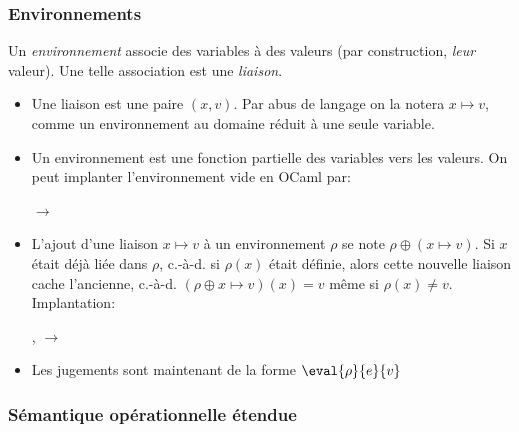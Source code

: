 %
\begin{frame}
\frametitle{Environnements}

Un \emph{environnement} associe des variables à des valeurs (par
construction, \emph{leur} valeur). Une telle association est une
\emph{liaison}.

\begin{itemize}

  \item Une liaison est une paire $(x,v)$. Par abus de
  langage on la notera $x \mapsto v$, comme un environnement au
  domaine réduit à une seule variable.

  \item Un environnement est une fonction partielle des
  variables vers les valeurs. On peut implanter l'environnement vide
  en OCaml par:

  \centerline{\small \Xlet {} \equal \Xfun {}
  $\rightarrow$  }

  \item L'ajout d'une liaison $x \mapsto v$ à un
  environnement $\rho$ se note $\rho \oplus (x \mapsto v)$. Si $x$
  était déjà liée dans $\rho$, c.-à-d. si $\rho (x)$ était définie,
  alors cette nouvelle liaison cache l'ancienne, c.-à-d. $(\rho \oplus
  x \mapsto v) (x) = v$ même si $\rho (x) \neq v$. Implantation:

  \centerline{\small \Xlet {} 
  \lpar{},\rpar{} \equal \Xfun {} $\rightarrow$
  \Xif {} \equal {} \Xthen {} \Xelse {}
  }

  \item Les jugements sont maintenant de la forme
  $\eval{\rho}{e}{v}$

\end{itemize}

\end{frame}

%
\begin{frame}
\frametitle{Sémantique opérationnelle étendue}

\label{semantique_operationnelle_etendue}



\end{frame}

